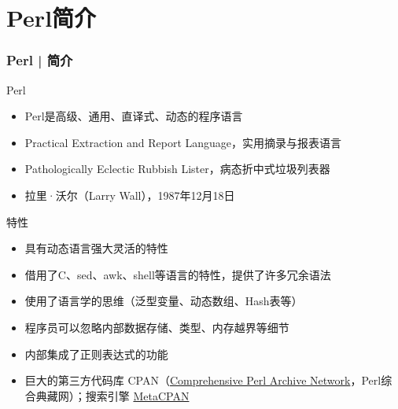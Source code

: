 \section{Perl简介}
\begin{frame}
  \frametitle{Perl | 简介}
  \begin{block}{Perl}
    \begin{itemize}
      \item Perl是高级、通用、直译式、动态的程序语言
      \item \alert{Practical Extraction and Report Language}，实用摘录与报表语言
      \item Pathologically Eclectic Rubbish Lister，病态折中式垃圾列表器
      \item 拉里·沃尔（\alert{Larry Wall}），\alert{1987年}12月18日
    \end{itemize}
  \end{block}
  \pause
  \begin{block}{特性}
    \begin{itemize}
      \item 具有动态语言强大灵活的特性
      \item 借用了C、sed、awk、shell等语言的特性，提供了许多冗余语法
      \item 使用了语言学的思维（泛型变量、动态数组、Hash表等）
      \item 程序员可以忽略内部数据存储、类型、内存越界等细节
      \item 内部集成了正则表达式的功能
      \item 巨大的第三方代码库 \alert{CPAN}（\href{http://www.cpan.org/}{Comprehensive Perl Archive Network}，Perl综合典藏网）；搜索引擎 \href{https://metacpan.org/}{MetaCPAN}
    \end{itemize}
  \end{block}
\end{frame}

